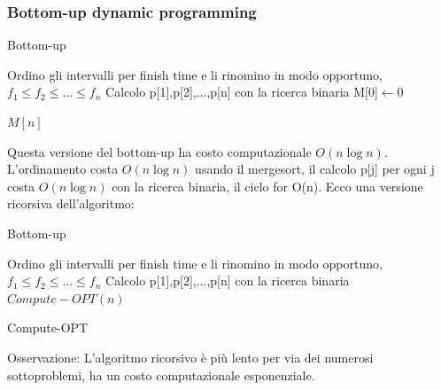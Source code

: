 \documentclass{article}
\begin{document}
\subsubsection{Bottom-up dynamic programming}
\begin{center}
\begin{algorithm}
\caption{Bottom-up}
Ordino gli intervalli per finish time e li rinomino in modo opportuno, $f_1 \leq f_2 \leq \dots \leq f_n$\;
Calcolo p[1],p[2],...,p[n] con la ricerca binaria\;
M[0]$\leftarrow$0\;

\Return $M[n]$\;
\end{algorithm}
\end{center}
Questa versione del bottom-up ha costo computazionale $O(n \log n)$. L'ordinamento costa $O(n \log n)$ usando il mergesort, il calcolo p[j] per ogni j costa $O(n \log n)$ con la ricerca binaria, il ciclo for O(n).
Ecco una versione ricorsiva dell'algoritmo:
\begin{center}
\begin{algorithm}
\caption{Bottom-up}
Ordino gli intervalli per finish time e li rinomino in modo opportuno, $f_1 \leq f_2 \leq \dots \leq f_n$\;
Calcolo p[1],p[2],...,p[n] con la ricerca binaria\;
\Return $Compute-OPT(n)$\;
\end{algorithm}
\end{center}
\begin{center}
\begin{algorithm}
\caption{Compute-OPT}
\end{algorithm}
\end{center}
Osservazione: L'algoritmo ricorsivo è più lento per via dei numerosi sottoproblemi, ha un costo computazionale esponenziale.
\end{document}
